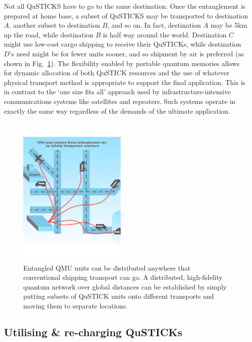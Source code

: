 \documentclass[twocolumn, aps, rmp, amsmath, amssymb, nofootinbib, superscriptaddress, longbibliography, floatfix, table-of-contents, eqsecnum]{revtex4-2}
\begin{document}
Not all QuSTICKS have to go to the same destination. Once the entanglement is prepared at home base, a subset of QuSTICKS may be transported to destination $A$, another subset to destination $B$, and so on. In fact, destination $A$ may be 5km up the road, while destination $B$ is half way around the world. Destination $C$ might use low-cost cargo shipping to receive their QuSTICKs, while destination $D$'s need might be for fewer units sooner, and so shipment by air is preferred (as shown in Fig.~\ref{fig:distribution}). The flexibility enabled by portable quantum memories allows for dynamic allocation of both QuSTICK resources and the use of whatever physical transport method is appropriate to support the final application. This is in contrast to the `one size fits all' approach used by infrastructure-intensive communications systems like satellites and repeaters. Such systems operate in exactly the same way regardless of the demands of the ultimate application.

\begin{figure}[htbp!]
	\includegraphics[clip=true, width=0.475\textwidth]{qustick3}
	\caption{Entangled QMU units can be distributed anywhere that conventional shipping transport can go.  A distributed, high-fidelity quantum network over global distances can be established by simply putting subsets of QuSTICK units onto different transports and moving them to separate locations.} \label{fig:distribution}
\end{figure}

\subsection{Utilising \& re-charging QuSTICKs}
\end{document}
